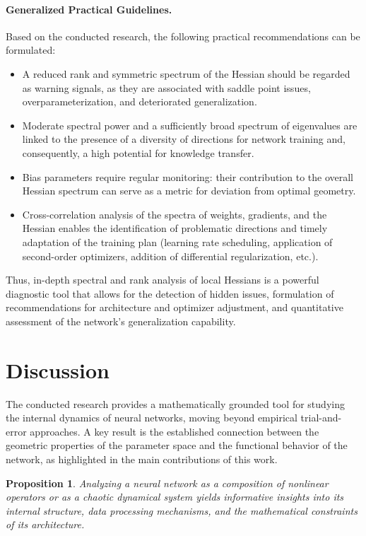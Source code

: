 \documentclass[a4paper,12pt]{article}
\newtheorem{proposition}{Proposition}
\begin{document}
\paragraph{Generalized Practical Guidelines.}
Based on the conducted research, the following practical recommendations can be formulated:
\begin{itemize}
  \item A reduced rank and symmetric spectrum of the Hessian should be regarded as warning signals, as they
    are associated with saddle point issues, overparameterization, and deteriorated generalization.
  \item Moderate spectral power and a sufficiently broad spectrum of eigenvalues are linked to the presence
    of a diversity of directions for network training and, consequently, a high potential for knowledge transfer.
  \item Bias parameters require regular monitoring: their contribution to the overall Hessian spectrum can
    serve as a metric for deviation from optimal geometry.
  \item Cross-correlation analysis of the spectra of weights, gradients, and the Hessian enables the
    identification of problematic directions and timely adaptation of the training plan (learning rate
    scheduling, application of second-order optimizers, addition of differential regularization, etc.).
\end{itemize}

Thus, in-depth spectral and rank analysis of local Hessians is a powerful diagnostic tool that allows for the
detection of hidden issues, formulation of recommendations for architecture and optimizer adjustment, and
quantitative assessment of the network's generalization capability.

\section{Discussion}
The conducted research provides a mathematically grounded tool for studying the internal dynamics of neural
networks, moving beyond empirical trial-and-error approaches. A key result is the established connection
between the geometric properties of the parameter space and the functional behavior of the network, as
highlighted in the main contributions of this work.

\begin{proposition}
  Analyzing a neural network as a composition of nonlinear operators or as a chaotic dynamical system yields
  informative insights into its internal structure, data processing mechanisms, and the mathematical
  constraints of its architecture.
\end{proposition}
\end{document}
